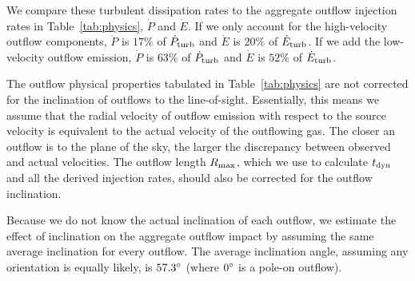 \documentclass[twocolumn]{aastex63}
\begin{document}


We compare these turbulent dissipation rates to the aggregate outflow injection rates in Table~\ref{tab:physics}, $\dot P$ and $\dot E$. If we only account for the high-velocity outflow components, $\dot P$ is $17\%$ of $\dot P_{\rm turb}$ and $\dot E$ is $20\%$ of $\dot E_{\rm turb}$. If we add the low-velocity outflow emission, $\dot P$ is $63\%$ of $\dot P_{\rm turb}$ and $\dot E$ is $52\%$ of $\dot E_{\rm turb}$.

The outflow physical properties tabulated in Table~\ref{tab:physics} are not corrected for the inclination of outflows to the line-of-sight. Essentially, this means we assume that the radial velocity of outflow emission with respect to the source velocity is equivalent to the actual velocity of the outflowing gas. The closer an outflow is to the plane of the sky, the larger the discrepancy between observed and actual velocities. The outflow length $R_{\rm max}$, which we use to calculate $t_{\rm dyn}$ and all the derived injection rates, should also be corrected for the outflow inclination.

Because we do not know the actual inclination of each outflow, we estimate the effect of inclination on the aggregate outflow impact by assuming the same average inclination for every outflow. The average inclination angle, assuming any orientation is equally likely, is $57.3\mbox{$^\circ$}$ (where $0\mbox{$^\circ$}$ is a pole-on outflow).

\end{document}
